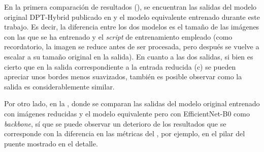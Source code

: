 En la primera comparación de resultados (), se encuentran las salidas del modelo original DPT-Hybrid publicado en \cite{visiontransformersDPT} y el modelo equivalente entrenado durante este trabajo. Es decir, la diferencia entre los dos modelos es el tamaño de las imágenes con las que se ha entrenado y el \textit{script} de entrenamiento empleado (como recordatorio, la imagen se reduce antes de ser procesada, pero después se vuelve a escalar a su tamaño original en la salida). En cuanto a las dos salidas, si bien es cierto que en la salida correspondiente a la entrada reducida (c) se pueden apreciar unos bordes menos suavizados, también es posible observar como la salida es considerablemente similar.

Por otro lado, en la , donde se comparan las salidas del modelo original entrenado con imágenes reducidas y el modelo equivalente pero con EfficientNet-B0 como \textit{backbone}, sí que se puede observar un deterioro de los resultados que se corresponde con la diferencia en las métricas del , por ejemplo, en el pilar del puente mostrado en el detalle.

\pagebreak

